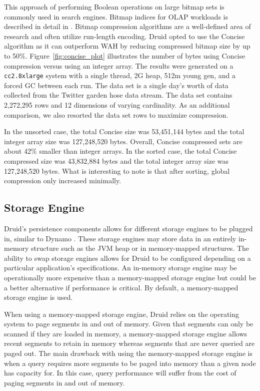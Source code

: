 \documentclass{acm_proc_article-sp}
\begin{document}
This approach of performing Boolean operations on large bitmap sets is commonly
used in search engines. Bitmap indices for OLAP workloads is described in
detail in \cite{o1997improved}. Bitmap compression algorithms are a
well-defined area of research \cite{antoshenkov1995byte, wu2006optimizing,
van2011memory} and often utilize run-length encoding. Druid opted to use the
Concise algorithm \cite{colantonio2010concise} as it can outperform WAH by
reducing compressed bitmap size by up to 50\%.  Figure~\ref{fig:concise_plot}
illustrates the number of bytes using Concise compression versus using an
integer array. The results were generated on a \texttt{cc2.8xlarge} system with a single
thread, 2G heap, 512m young gen, and a forced GC between each run. The data set
is a single day’s worth of data collected from the Twitter garden hose
\cite{twitter2013} data stream. The data set contains 2,272,295 rows and 12
dimensions of varying cardinality. As an additional comparison, we also
resorted the data set rows to maximize compression.

In the unsorted case, the total Concise size was 53,451,144 bytes and the total
integer array size was 127,248,520 bytes. Overall, Concise compressed sets are
about 42\% smaller than integer arrays.  In the sorted case, the total Concise
compressed size was 43,832,884 bytes and the total integer array size was
127,248,520 bytes.  What is interesting to note is that after sorting, global
compression only increased minimally.

\subsection{Storage Engine}
Druid’s persistence components allows for different storage engines to be
plugged in, similar to Dynamo \cite{decandia2007dynamo}. These storage engines
may store data in an entirely in-memory structure such as the JVM heap or in
memory-mapped structures. The ability to swap storage engines allows for Druid
to be configured depending on a particular application’s specifications. An
in-memory storage engine may be operationally more expensive than a
memory-mapped storage engine but could be a better alternative if performance
is critical. By default, a memory-mapped storage engine is used.

When using a memory-mapped storage engine, Druid relies on the operating system
to page segments in and out of memory.  Given that segments can only be scanned
if they are loaded in memory, a memory-mapped storage engine allows recent
segments to retain in memory whereas segments that are never queried are paged
out. The main drawback with using the memory-mapped storage engine is when a
query requires more segments to be paged into memory than a given node has
capacity for. In this case, query performance will suffer from the cost of
paging segments in and out of memory.
\end{document}
